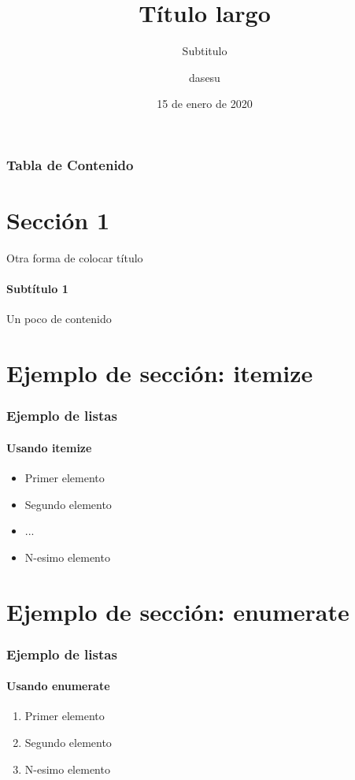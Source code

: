 \documentclass{beamer}
\title[Título corto]{Título largo}
\subtitle{Subtitulo}
\author{dasesu}
\institute{Nombre de la institución}
\date{15 de enero de 2020}
\begin{document}

  \begin{frame}
  \titlepage %
  \end{frame}


  \begin{frame}
    \frametitle{Tabla de Contenido} %
    \tableofcontents %
  \end{frame}


  \section{Sección 1}  %
  \begin{frame}{Otra forma de colocar título} %
    \framesubtitle{Subtítulo 1} %

    Un poco de contenido %

  \end{frame}


  \section{Ejemplo de sección: itemize} %
  \begin{frame}
    \frametitle{Ejemplo de listas}
    \framesubtitle{Usando itemize}
    \begin{itemize}
       \item Primer elemento
       \item Segundo elemento
       \item ...
       \item N-esimo elemento
    \end{itemize}
  \end{frame}


  \section{Ejemplo de sección: enumerate} %
  \begin{frame}
    \frametitle{Ejemplo de listas}
    \framesubtitle{Usando enumerate}
    \begin{enumerate}
      \item Primer elemento
      \item Segundo elemento
      \item N-esimo elemento
    \end{enumerate}
  \end{frame}
\end{document}
